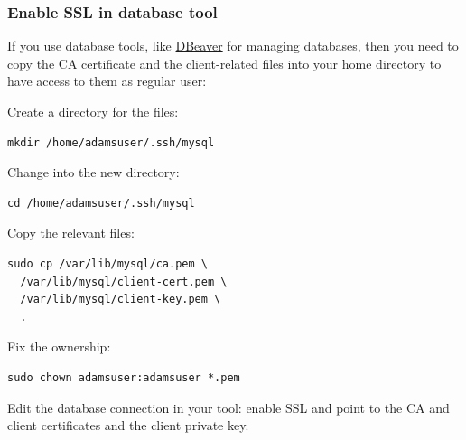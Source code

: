 \subsubsection{Enable SSL in database tool}
If you use database tools, like \href{https://dbeaver.io/}{DBeaver} for managing databases, then
you need to copy the CA certificate and the client-related files into your home directory to have access
to them as regular user:
\begin{tight_itemize}
    \item Create a directory for the files:
    \begin{verbatim}
mkdir /home/adamsuser/.ssh/mysql
    \end{verbatim}
    \item Change into the new directory:
    \begin{verbatim}
cd /home/adamsuser/.ssh/mysql
    \end{verbatim}
    \item Copy the relevant files:
    \begin{verbatim}
sudo cp /var/lib/mysql/ca.pem \
  /var/lib/mysql/client-cert.pem \
  /var/lib/mysql/client-key.pem \
  .
    \end{verbatim}
    \item Fix the ownership:
    \begin{verbatim}
sudo chown adamsuser:adamsuser *.pem
    \end{verbatim}
    \item Edit the database connection in your tool: enable SSL and point to the CA and client
    certificates and the client private key.
\end{tight_itemize}


